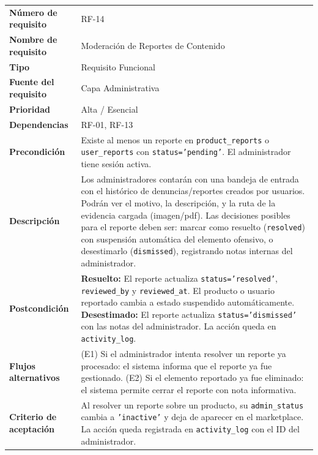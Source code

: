 \documentclass[11pt,a4paper]{report}
\begin{document}
\begin{table}[H]
\centering
\begin{tabularx}{\textwidth}{|l|L|}
\hline
{} \\ \hline
\textbf{Número de requisito} & RF-14 \\ \hline
\textbf{Nombre de requisito} & Moderación de Reportes de Contenido \\ \hline
\textbf{Tipo} & Requisito Funcional \\ \hline
\textbf{Fuente del requisito} & Capa Administrativa \\ \hline
\textbf{Prioridad} & Alta / Esencial \\ \hline
\textbf{Dependencias} & RF-01, RF-13 \\ \hline
\textbf{Precondición} & Existe al menos un reporte en \texttt{product\_reports} o \texttt{user\_reports} con \texttt{status='pending'}. El administrador tiene sesión activa. \\ \hline
\textbf{Descripción} & Los administradores contarán con una bandeja de entrada con el histórico de denuncias/reportes creados por usuarios. Podrán ver el motivo, la descripción, y la ruta de la evidencia cargada (imagen/pdf). Las decisiones posibles para el reporte deben ser: marcar como resuelto (\texttt{resolved}) con suspensión automática del elemento ofensivo, o desestimarlo (\texttt{dismissed}), registrando notas internas del administrador. \\ \hline
\textbf{Postcondición} & \textbf{Resuelto:} El reporte actualiza \texttt{status='resolved'}, \texttt{reviewed\_by} y \texttt{reviewed\_at}. El producto o usuario reportado cambia a estado suspendido automáticamente. \textbf{Desestimado:} El reporte actualiza \texttt{status='dismissed'} con las notas del administrador. La acción queda en \texttt{activity\_log}. \\ \hline
\textbf{Flujos alternativos} & (E1) Si el administrador intenta resolver un reporte ya procesado: el sistema informa que el reporte ya fue gestionado. (E2) Si el elemento reportado ya fue eliminado: el sistema permite cerrar el reporte con nota informativa. \\ \hline
\textbf{Criterio de aceptación} & Al resolver un reporte sobre un producto, su \texttt{admin\_status} cambia a \texttt{'inactive'} y deja de aparecer en el marketplace. La acción queda registrada en \texttt{activity\_log} con el ID del administrador. \\ \hline
\end{tabularx}
\end{table}
\end{document}
